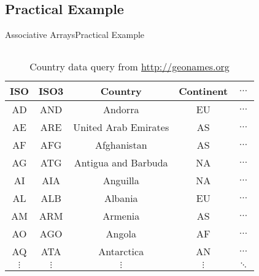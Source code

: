 
\subsection{Practical Example}

\begin{frame}{Associative Arrays}{Practical Example}
  \vspace{-2.0em}
  \begin{columns}
    \begin{column}{0.9\textwidth}
      \begin{table}[!t]
        \caption{Country data query from \url{http://geonames.org}}
        \label{tab:extended_sorting:country_query}
        \begin{tabular}{ccccc}
          ISO & ISO3 & Country & Continent & $\dots$\\
          \midrule
          AD & AND & Andorra & EU & $\dots$\\
          AE & ARE & United Arab Emirates & AS & $\dots$\\
          AF & AFG & Afghanistan & AS & $\dots$\\
          AG & ATG & Antigua and Barbuda & NA & $\dots$\\
          AI & AIA & Anguilla & NA & $\dots$\\
          AL & ALB & Albania & EU & $\dots$\\
          AM & ARM & Armenia & AS & $\dots$\\
          AO & AGO & Angola & AF & $\dots$\\
          AQ & ATA & Antarctica & AN & $\dots$\\
          $\vdots$ & $\vdots$ & $\vdots$ & $\vdots$ & $\ddots$
        \end{tabular}
      \end{table}
    \end{column}
    \begin{column}{0.1\textwidth}
      \vspace{-6.0em}
      \\
    \end{column}
  \end{columns}
\end{frame}


